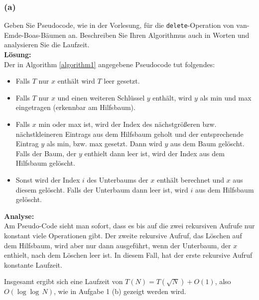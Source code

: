 \subsubsection*{(a)}


Geben Sie Pseudocode, wie in der Vorlesung, für die \lstinline|delete|-Operation von van-Emde-Boas-Bäumen an. Beschreiben Sie Ihren Algorithmus auch in Worten und analysieren Sie die Laufzeit.\\

\noindent\textbf{Lösung:}\\
Der in Algorithm \ref{algorithm1} angegebene Pseudocode tut folgendes:
\begin{itemize}
	\item Falls $T$ nur $x$ enthält wird $T$ leer gesetzt.
	\item Falls $T$ nur $x$ und einen weiteren Schlüssel $y$ enthält, wird $y$ als min und max eingetragen (erkennbar am Hilfsbaum).
	\item Falls $x$ min oder max ist, wird der Index des nächstgrößeren bzw. nächstkleineren Eintrags  aus dem Hilfsbaum geholt und der entsprechende Eintrag $y$ als min, bzw. max gesetzt. Dann wird $y$ aus dem Baum gelöscht. Falls der Baum, der $y$ enthielt dann leer ist, wird der Index aus dem Hilfsbaum gelöscht.
	\item Sonst wird der Index $i$ des Unterbaums der $x$ enthält berechnet und $x$ aus diesem gelöscht. Falls der Unterbaum dann leer ist, wird $i$ aus dem Hilfsbaum gelöscht.
\end{itemize}
\noindent\textbf{Analyse:}\\
Am Pseudo-Code sieht man sofort, dass es bis auf die zwei rekursiven Aufrufe nur konstant viele Operationen gibt. Der zweite rekursive Aufruf, das Löschen auf dem Hilfsbaum, wird aber nur dann ausgeführt, wenn der Unterbaum, der $x$ enthielt, nach dem Löschen leer ist. In diesem Fall, hat der erste rekursive Aufruf konstante Laufzeit.

Insgesamt ergibt sich eine Laufzeit von $T(N) = T(\sqrt{N}) + O(1)$, also $O(\log\log \, N)$, wie in Aufgabe 1 (b) gezeigt werden wird.

